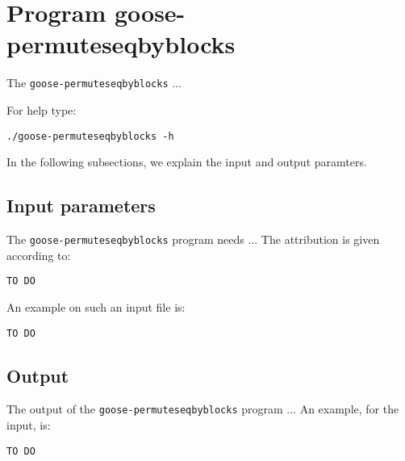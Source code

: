 \section{Program goose-permuteseqbyblocks}
The \texttt{goose-permuteseqbyblocks} ...

For help type:
\begin{lstlisting}
./goose-permuteseqbyblocks -h
\end{lstlisting}
In the following subsections, we explain the input and output paramters.

\subsection{Input parameters}

The \texttt{goose-permuteseqbyblocks} program needs ...
The attribution is given according to:
\begin{lstlisting}
TO DO
\end{lstlisting}

An example on such an input file is:
\begin{lstlisting}
TO DO
\end{lstlisting}

\subsection{Output}
The output of the \texttt{goose-permuteseqbyblocks} program ...
An example, for the input, is:
\begin{lstlisting}
TO DO
\end{lstlisting}
